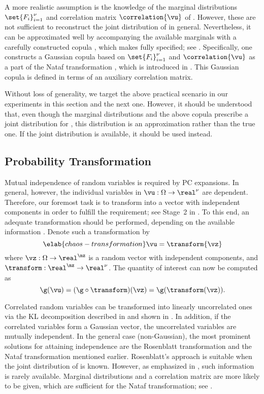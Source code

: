 A more realistic assumption is the knowledge of the marginal distributions
$\set{F_i}_{i = 1}^\nu$ and correlation matrix $\correlation{\vu}$ of \vu.
However, these are not sufficient to reconstruct the joint distribution of \vu
in general. Nevertheless, it can be approximated well by accompanying the
available marginals with a carefully constructed copula \cite{nelsen2006}, which
makes \vu fully specified; see . Specifically, one
constructs a Gaussian copula based on $\set{F_i}_{i = 1}^\nu$ and
$\correlation{\vu}$ as a part of the Nataf transformation \cite{liu1986}, which
is introduced in . This Gaussian copula is
defined in terms of an auxiliary correlation matrix.

Without loss of generality, we target the above practical scenario in our
experiments in this section and the next one. However, it should be understood
that, even though the marginal distributions and the above copula prescribe a
joint distribution for \vu, this distribution is an approximation rather than
the true one. If the joint distribution is available, it should be used instead.

\subsection{Probability Transformation}

Mutual independence of random variables is required by \ac{PC} expansions. In
general, however, the individual variables in $\vu: \Omega \to \real^\nu$ are
dependent. Therefore, our foremost task is to transform \vu into a vector with
independent components in order to fulfill the requirement; see Stage~2 in
. To this end, an adequate transformation should be
performed, depending on the available information \cite{eldred2008}. Denote such
a transformation by
\begin{equation} \elab{chaos-transformation}
  \vu = \transform{\vz}
\end{equation}
where $\vz: \Omega \to \real^\nz$ is a random vector with \nz independent
components, and $\transform: \real^\nz \to \real^\nu$. The quantity of interest
\g can now be computed as
\[
  \g(\vu) = (\g \circ \transform)(\vz) = \g(\transform(\vz)).
\]

Correlated random variables can be transformed into linearly uncorrelated ones
via the \ac{KL} decomposition described in  and
shown in . In addition, if the correlated variables form a
Gaussian vector, the uncorrelated variables are mutually independent. In the
general case (non-Gaussian), the most prominent solutions for attaining
independence are the Rosenblatt transformation \cite{rosenblatt1952} and the
Nataf transformation mentioned earlier. Rosenblatt's approach is suitable when
the joint distribution of \vu is known. However, as emphasized in
, such information is rarely available. Marginal
distributions and a correlation matrix are more likely to be given, which are
sufficient for the Nataf transformation; see .

